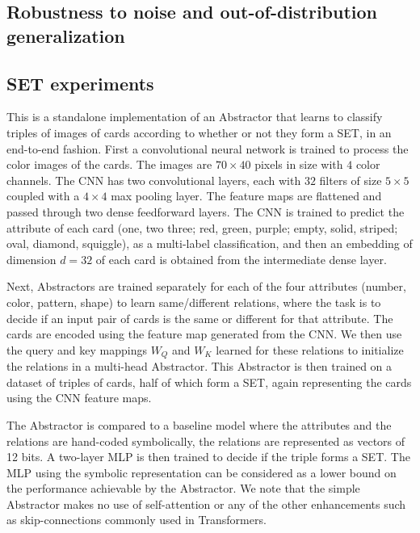 \subsection{Robustness to noise and out-of-distribution generalization}

\subsection{SET experiments}

This is a standalone implementation of an Abstractor that learns to classify triples of images of cards according 
to whether or not they form a SET, in an end-to-end fashion. First a convolutional neural network is trained to process the color images of the cards. The images are $70 \times 40$ pixels in size with $4$ color channels. The CNN has two convolutional layers, each with $32$ filters of size $5\times 5$ coupled with a $4\times 4$ max pooling layer. The feature maps are flattened and passed through two dense feedforward layers. The CNN is trained to predict the attribute of each card (one, two three; red, green, purple; empty, solid, striped; oval, diamond, squiggle), as a multi-label classification, and then an embedding of dimension $d=32$ of each card is obtained from the intermediate dense layer. 

Next, Abstractors are trained separately for each of the four attributes (number, color, pattern, shape) to learn same/different relations, where the task is to decide if an input pair of cards is the same or different for that attribute. The cards are encoded using the feature map generated from the CNN. We then use the query and key mappings $W_Q$ and $W_K$ learned for these relations to initialize the relations in a multi-head Abstractor. This Abstractor is then trained on a dataset of triples of cards, half of which form a SET, again representing the cards using the CNN feature maps.

The Abstractor is compared to a baseline model where the attributes and the relations are hand-coded symbolically, the relations are represented as vectors of 12 bits. A two-layer MLP is then trained to decide if the triple forms a SET. The MLP using the symbolic representation can be considered as a lower bound on the performance achievable by the Abstractor. We note that the simple Abstractor makes no use of self-attention or any of the other enhancements such as skip-connections commonly used in Transformers.
